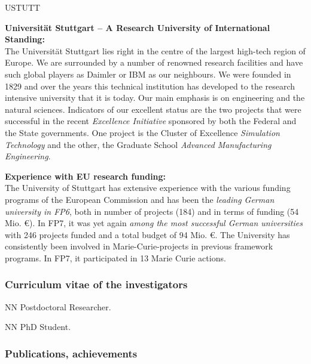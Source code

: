 \begin{sitedescription}{USTUTT} \label{desc:USTUTT}

{\bf Universität Stuttgart -- A Research University of International Standing:}\\
The Universität Stuttgart lies right in the centre of the largest high-tech region of Europe. We are surrounded by a number of renowned research facilities and have such global players as Daimler or IBM as our neighbours. We were founded in 1829 and over the years this technical institution has developed to the research intensive university that it is today. Our main emphasis is on engineering and the natural sciences.
%
Indicators of our excellent status are the two projects that were successful in the recent {\it Excellence Initiative} sponsored by both the Federal and the State governments. One project is the Cluster of Excellence {\it Simulation Technology} and the other, the Graduate School {\it Advanced Manufacturing Engineering}.

{\bf Experience with EU research funding:}\\
The University of Stuttgart has extensive experience with the various funding programs of the European Commission and has been the {\it leading German university in FP6}, both in number of projects (184) and in terms of funding (54 Mio. \euro). In FP7, it was yet again {\it among the most successful German universities} with 246 projects funded and a total budget of 94 Mio. \euro. The University has consistently been involved in Marie-Curie-projects in previous framework programs. In FP7, it participated in 13 Marie Curie actions.

\subsubsection*{Curriculum vitae of the investigators}




\begin{participant}[type=res,PM=48,salary=5500]{NN}
Postdoctoral Researcher.
\end{participant}
\begin{participant}[type=res,PM=36,salary=5500]{NN}
PhD Student.
\end{participant}

\subsubsection*{Publications, achievements}


\end{sitedescription}
